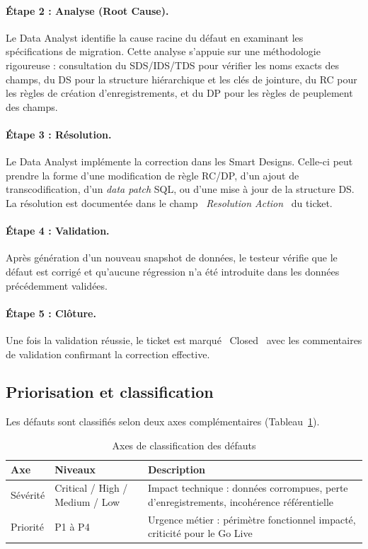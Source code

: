 \paragraph{Étape 2 : Analyse (Root Cause).}
Le Data Analyst identifie la cause racine du défaut en examinant les spécifications de migration. Cette analyse s'appuie sur une méthodologie rigoureuse : consultation du SDS/IDS/TDS pour vérifier les noms exacts des champs, du DS pour la structure hiérarchique et les clés de jointure, du RC pour les règles de création d'enregistrements, et du DP pour les règles de peuplement des champs.

\paragraph{Étape 3 : Résolution.}
Le Data Analyst implémente la correction dans les Smart Designs. Celle-ci peut prendre la forme d'une modification de règle RC/DP, d'un ajout de transcodification, d'un \textit{data patch} SQL, ou d'une mise à jour de la structure DS. La résolution est documentée dans le champ \og~\textit{Resolution Action}~\fg{} du ticket.

\paragraph{Étape 4 : Validation.}
Après génération d'un nouveau snapshot de données, le testeur vérifie que le défaut est corrigé et qu'aucune régression n'a été introduite dans les données précédemment validées.

\paragraph{Étape 5 : Clôture.}
Une fois la validation réussie, le ticket est marqué \og~Closed~\fg{} avec les commentaires de validation confirmant la correction effective.

\subsection{Priorisation et classification}
\label{subsec:priorisation}

Les défauts sont classifiés selon deux axes complémentaires (Tableau~\ref{tab:severite-priorite}).

\begin{table}[H]
\centering
\caption{Axes de classification des défauts}
\label{tab:severite-priorite}
\begin{tabularx}{\textwidth}{llX}
\toprule
\textbf{Axe} & \textbf{Niveaux} & \textbf{Description} \\
\midrule
Sévérité & Critical / High / Medium / Low & Impact technique : données corrompues, perte d'enregistrements, incohérence référentielle \\
\addlinespace
Priorité & P1 à P4 & Urgence métier : périmètre fonctionnel impacté, criticité pour le Go Live \\
\bottomrule
\end{tabularx}
\end{table}

